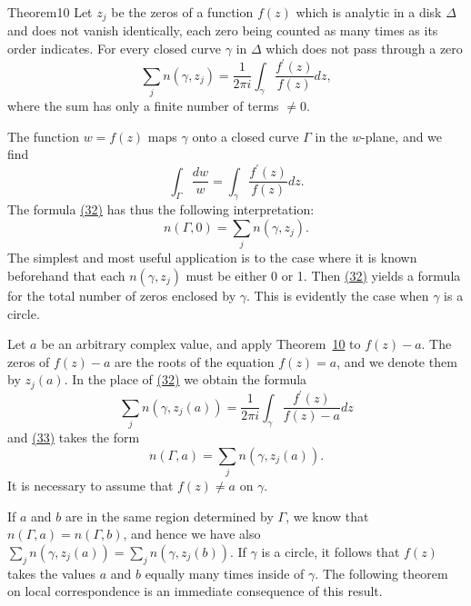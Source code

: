 \begin{originalstatement}{Theorem}{10}\label{thm:4.10}
Let $z_{j}$ be the zeros of a function $f(z)$ which is analytic in a disk $\Delta$ and does not vanish identically, each zero being counted as many times as its order indicates. For every closed curve $\gamma$ in $\Delta$ which does not pass through a zero
\begin{equation*}
\sum_ {j} n (\gamma , z _ {j}) = \frac {1}{2 \pi i} \int_ {\gamma} \frac {f ^ {\prime} (z)}{f (z)} d z,\tag{32}\label{eq:4.32}
\end{equation*}
where the sum has only a finite number of terms $\neq 0$.

\end{originalstatement}
The function $w = f(z)$ maps $\gamma$ onto a closed curve $\Gamma$ in the $w$-plane, and we find
\begin{equation*}
\int_ {\Gamma} \frac {d w}{w} = \int_ {\gamma} \frac {f ^ {\prime} (z)}{f (z)} d z.
\end{equation*}
The formula \hyperref[eq:4.32]{(32)} has thus the following interpretation:
\begin{equation*}
n (\Gamma , 0) = \sum_ {j} n (\gamma , z _ {j}).\tag{33}\label{eq:4.33}
\end{equation*}
The simplest and most useful application is to the case where it is known beforehand that each $n(\gamma,z_{j})$ must be either 0 or 1. Then \hyperref[eq:4.32]{(32)} yields a formula for the total number of zeros enclosed by $\gamma$. This is evidently the case when $\gamma$ is a circle.

Let $a$ be an arbitrary complex value, and apply Theorem~\hyperref[thm:4.10]{10} to $f(z) - a$. The zeros of $f(z) - a$ are the roots of the equation $f(z) = a$, and we denote them by $z_j(a)$. In the place of \hyperref[eq:4.32]{(32)} we obtain the formula
\begin{equation*}
\sum_ {j} n (\gamma , z _ {j} (a)) = \frac {1}{2 \pi i} \int_ {\gamma} \frac {f ^ {\prime} (z)}{f (z) - a} d z
\end{equation*}
and \hyperref[eq:4.33]{(33)} takes the form
\begin{equation*}
n (\Gamma , a) = \sum_ {j} n (\gamma , z _ {j} (a)).
\end{equation*}
It is necessary to assume that $f(z) \neq a$ on $\gamma$.

If $a$ and $b$ are in the same region determined by $\Gamma$, we know that $n(\Gamma, a) = n(\Gamma, b)$, and hence we have also $\sum_{j} n(\gamma, z_j(a)) = \sum_{j} n(\gamma, z_j(b))$. If $\gamma$ is a circle, it follows that $f(z)$ takes the values $a$ and $b$ equally many times inside of $\gamma$. The following theorem on local correspondence is an immediate consequence of this result.

